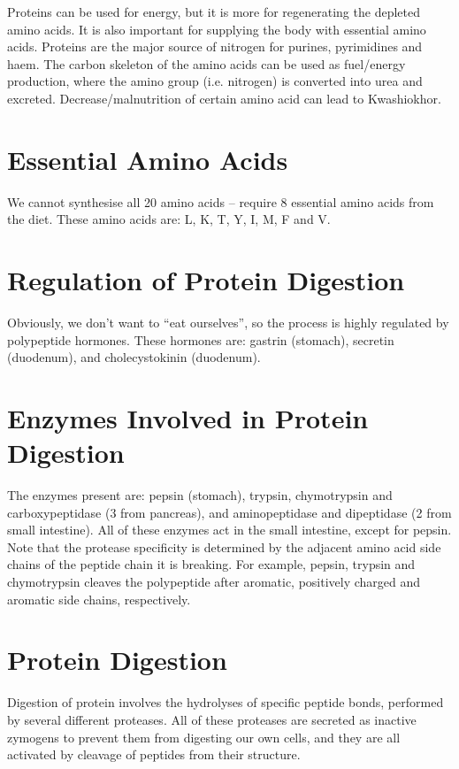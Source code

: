 \documentclass[a4paper, 12pt]{report}
\begin{document}
Proteins can be used for energy, but it is more for regenerating the depleted amino acids.
It is also important for supplying the body with essential amino acids.
Proteins are the major source of nitrogen for purines, pyrimidines and haem.
The carbon skeleton of the amino acids can be used as fuel/energy production, where the amino group (i.e. nitrogen) is converted into urea and excreted.
Decrease/malnutrition of certain amino acid can lead to Kwashiokhor.

\section{Essential Amino Acids}

We cannot synthesise all 20 amino acids -- require 8 essential amino acids from the diet.
These amino acids are: L, K, T, Y, I, M, F and V.

\section{Regulation of Protein Digestion}

Obviously, we don't want to ``eat ourselves'', so the process is highly regulated by polypeptide hormones.
These hormones are: gastrin (stomach), secretin (duodenum), and cholecystokinin (duodenum).

\section{Enzymes Involved in Protein Digestion}

The enzymes present are: pepsin (stomach), trypsin, chymotrypsin and carboxypeptidase (3 from pancreas), and aminopeptidase and dipeptidase (2 from small intestine).
All of these enzymes act in the small intestine, except for pepsin.
Note that the protease specificity is determined by the adjacent amino acid side chains of the peptide chain it is breaking.
For example, pepsin, trypsin and chymotrypsin cleaves the polypeptide after aromatic, positively charged and aromatic side chains, respectively.

\section{Protein Digestion}

Digestion of protein involves the hydrolyses of specific peptide bonds, performed by several different proteases.
All of these proteases are secreted as inactive zymogens to prevent them from digesting our own cells, and they are all activated by cleavage of peptides from their structure.
\end{document}
